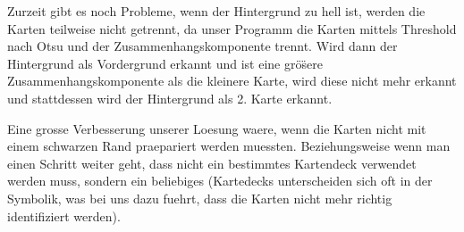 \documentclass[paper=A4, deutsch]{scrartcl}
\begin{document}
Zurzeit gibt es noch Probleme, wenn der Hintergrund zu hell ist, werden die Karten teilweise nicht getrennt,
da unser Programm die Karten mittels Threshold nach Otsu und der Zusammenhangskomponente trennt. Wird 
dann der Hintergrund als Vordergrund erkannt und ist eine gr\"o\"sere Zusammenhangskomponente als die kleinere Karte, wird diese nicht mehr erkannt
und stattdessen wird der Hintergrund als 2. Karte erkannt.

Eine grosse Verbesserung unserer Loesung waere, wenn die Karten nicht mit einem schwarzen Rand
praepariert werden muessten. Beziehungsweise wenn man einen Schritt weiter geht, dass nicht ein
bestimmtes Kartendeck verwendet werden muss, sondern ein beliebiges (Kartedecks unterscheiden sich oft
in der Symbolik, was bei uns dazu fuehrt, dass die Karten nicht mehr richtig identifiziert werden).



\end{document}
